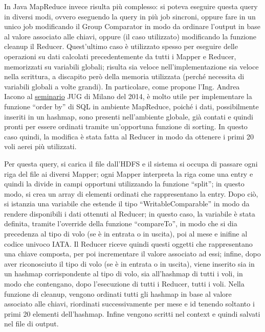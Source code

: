 \documentclass[11pt]{article} %
\begin{document}
In Java MapReduce invece risulta più complesso: si poteva eseguire questa query in diversi modi, ovvero eseguendo la query in più job sincroni, oppure fare in un unico job modificando il Group Comparator in modo da ordinare l'output in base al valore associato alle chiavi, oppure (il caso utilizzato) modificando la funzione cleanup il Reducer. Quest'ultimo caso è utilizzato spesso per eseguire delle operazioni su dati calcolati precedentemente da tutti i Mapper e Reducer, memorizzati su variabili globali; risulta sia veloce nell'implementazione sia veloce nella scrittura, a discapito però della memoria utilizzata (perché necessita di variabili globali a volte grandi). In particolare, come propone l'Ing. Andrea Iacono al \href{http://www.slideshare.net/andreaiacono/mapreduce-34478449}{seminario} JUG di Milano del 2014, è molto utile per implementare la funzione ``order by'' di SQL in ambiente MapReduce, poiché i dati, possibilmente inseriti in un hashmap, sono presenti nell'ambiente globale, già contati e quindi pronti per essere ordinati tramite un'opportuna funzione di sorting. In questo caso quindi, la modifica è stata fatta al Reducer in modo da ottenere i primi 20 voli aerei più utilizzati.

Per questa query, si carica il file dall'HDFS e il sistema si occupa di passare ogni riga del file ai diversi Mapper; ogni Mapper interpreta la riga come una entry e quindi la divide in campi opportuni utilizzando la funzione ``split''; in questo modo, si crea un array di elementi ordinati che rappresentano la entry. Dopo ciò, si istanzia una variabile che estende il tipo ``WritableComparable'' in modo da rendere disponibili i dati ottenuti al Reducer; in questo caso, la variabile è stata definita, tramite l'override della funzione ``compareTo'',  in modo che si dia precedenza al tipo di volo (se è in entrata o in uscita), poi al mese e inifine al codice univoco IATA. Il Reducer riceve quindi questi oggetti che rappresentano una chiave composta, per poi incrementare il valore associato ad essi; infine, dopo aver riconosciuto il tipo di volo (se è in entrata o in uscita), viene inserito sia in un hashmap corrispondente al tipo di volo, sia all'hashmap di tutti i voli, in modo che contengano, dopo l'esecuzione di tutti i Reducer, tutti i voli. Nella funzione di cleanup, vengono ordinati tutti gli hashmap in base al valore associato alle chiavi, riordinati successivamente per mese e id tenendo soltanto i primi 20 elementi dell'hashmap. Infine vengono scritti nel context e quindi salvati nel file di output. 
\end{document}
